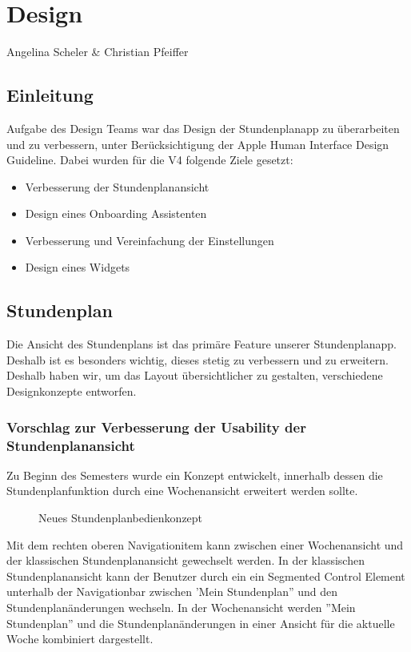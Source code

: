 \chapter{Design}
Angelina Scheler \& Christian Pfeiffer

\section{Einleitung}
Aufgabe des Design Teams war das Design der Stundenplanapp zu überarbeiten und zu verbessern, unter Berücksichtigung der Apple Human Interface Design Guideline. Dabei wurden für die V4 folgende Ziele gesetzt:

\begin{itemize}
\item Verbesserung der Stundenplanansicht
\item Design eines Onboarding Assistenten
\item Verbesserung und Vereinfachung der Einstellungen
\item Design eines Widgets
\end{itemize}


\section{Stundenplan}
Die Ansicht des Stundenplans ist das primäre Feature unserer Stundenplanapp. Deshalb ist es besonders wichtig, dieses stetig zu verbessern und zu erweitern.
Deshalb haben wir, um das Layout übersichtlicher zu gestalten, verschiedene Designkonzepte entworfen.

\subsection{Vorschlag zur Verbesserung der Usability der Stundenplanansicht}
Zu Beginn des Semesters wurde ein Konzept entwickelt, innerhalb dessen die Stundenplanfunktion durch eine Wochenansicht erweitert werden sollte. 

\begin{figure}[H]
	\centering
	\caption{Neues Stundenplanbedienkonzept}
	\label{fig1}
\end{figure}

Mit dem rechten oberen Navigationitem kann zwischen einer Wochenansicht und der klassischen Stundenplanansicht gewechselt werden. In der klassischen Stundenplanansicht kann der Benutzer durch ein ein Segmented Control Element unterhalb der Navigationbar zwischen 'Mein Stundenplan'' und den Stundenplanänderungen wechseln. In der Wochenansicht werden ''Mein Stundenplan'' und die Stundenplanänderungen in einer Ansicht für die aktuelle Woche kombiniert dargestellt. 

